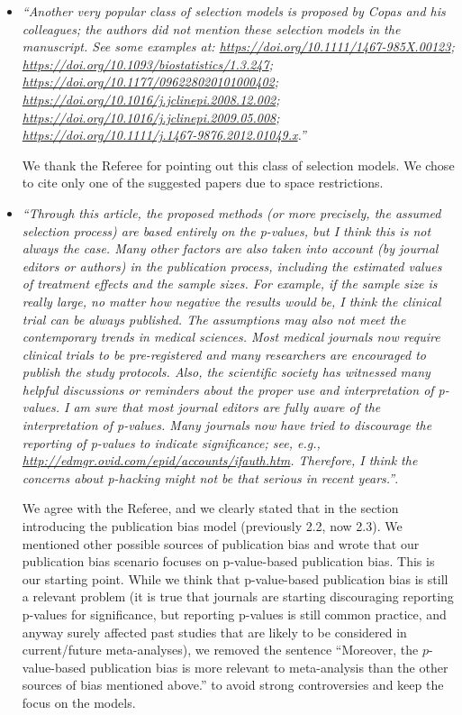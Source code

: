 \documentclass[11pt]{article}
\begin{document}
\begin{itemize}
\item \emph{``Another very popular class of selection models is proposed by Copas and his colleagues; the authors did not mention these selection models in the manuscript. See some examples at: \url{https://doi.org/10.1111/1467-985X.00123}; \url{https://doi.org/10.1093/biostatistics/1.3.247}; \url{https://doi.org/10.1177/096228020101000402}; \url{https://doi.org/10.1016/j.jclinepi.2008.12.002}; \url{https://doi.org/10.1016/j.jclinepi.2009.05.008}; \url{https://doi.org/10.1111/j.1467-9876.2012.01049.x}.''}

We thank the Referee for pointing out this class of selection models. We chose to cite only one of the suggested papers due to space restrictions.



\item \emph{``Through this article, the proposed methods (or more precisely, the assumed selection process) are based entirely on the p-values, but I think this is not always the case. Many other factors are also taken into account (by journal editors or authors) in the publication process, including the estimated values of treatment effects and the sample sizes. For example, if the sample size is really large, no matter how negative the results would be, I think the clinical trial can be always published. The assumptions may also not meet the contemporary trends in medical sciences. Most medical journals now require clinical trials to be pre-registered and many researchers are encouraged to publish the study protocols. Also, the scientific society has witnessed many helpful discussions or reminders about the proper use and interpretation of p-values. I am sure that most journal editors are fully aware of the interpretation of p-values. Many journals now have tried to discourage the reporting of p-values to indicate significance; see, e.g., \url{http://edmgr.ovid.com/epid/accounts/ifauth.htm}. Therefore, I think the concerns about p-hacking might not be that serious in recent years.''}.


We agree with the Referee, and we clearly stated that in the section introducing the publication bias model (previously 2.2, now 2.3). We mentioned other possible sources of publication bias and wrote that our publication bias scenario focuses on p-value-based publication bias. This is our starting point. While we think that p-value-based publication bias is still a relevant problem (it is true that journals are starting discouraging reporting p-values for significance, but reporting p-values is still common practice, and anyway surely affected past studies that are likely to be considered in current/future meta-analyses), we removed the sentence ``Moreover, the $p$-value-based publication bias is more relevant to meta-analysis than the other sources of bias mentioned above.'' to avoid strong controversies and keep the focus on the models.




\end{itemize}
\end{document}
